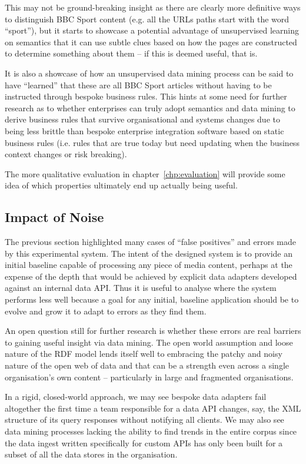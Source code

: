 This may not be ground-breaking insight as there are clearly more
definitive ways to distinguish BBC Sport content (e.g. all the URLs
paths start with the word ``sport''), but it starts to showcase a
potential advantage of unsupervised learning on semantics that it
can use subtle clues based on how the pages are constructed to
determine something about them -- if this is deemed useful, that is.

It is also a showcase of how an unsupervised data mining process can
be said to have ``learned'' that these are all BBC Sport articles
without having to be instructed through bespoke business rules. This
hints at some need for further research as to whether enterprises
can truly adopt semantics and data mining to derive business rules
that survive organisational and systems changes due to being less
brittle than bespoke enterprise integration software based on static
business rules (i.e. rules that are true today but need updating when
the business context changes or risk breaking).

The more qualitative evaluation in chapter~\ref{chp:evaluation} will
provide some idea of which properties ultimately end up actually being
useful.

\subsection{Impact of Noise}
\label{sec:impact-of-noise}

The previous section highlighted many cases of ``false positives''
and errors made by this experimental system. The intent of the
designed system is to provide an
initial baseline capable of processing any piece of media content,
perhaps at the expense of the depth that would be achieved by explicit
data adapters developed against an internal data API. Thus it is
useful to analyse where the system performs less well because a goal
for any initial, baseline application should be to evolve and grow it
to adapt to errors as they find them.

An open question still for further research is whether these errors
are real barriers to gaining useful insight via data mining. The
open world assumption and loose nature of the RDF model lends itself
well to embracing the patchy and noisy nature of the open web of data
and that can be a strength even across a single organisation's
own content -- particularly in large and fragmented organisations.

In a rigid, closed-world approach, we may see bespoke data adapters
fail altogether the first time a team responsible for a data API
changes, say, the XML structure of its query responses without
notifying all clients. We may also see data mining processes lacking
the ability to find trends in the entire corpus since the data
ingest written specifically for custom APIs has only been built for
a subset of all the data stores in the organisation.

